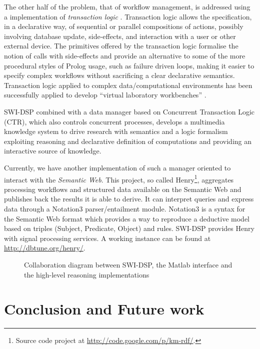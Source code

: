 \documentclass[runningheads]{llncs}
\begin{document}
The other half of the problem, that of workflow management, is addressed using a implementation of \emph{transaction logic} \cite{ctl}. Transaction logic allows the specification, in a declarative way, of sequential or parallel compositions of actions, possibly involving database update, side-effects, and interaction with a user or other external device. The primitives offered by the transaction logic formalise the notion of calls with side-effects and
provide an alternative to some of the more procedural styles of Prolog usage, such as failure driven loops, making it easier to specify complex workflows without sacrificing a clear declarative semantics. Transaction logic applied to complex data/computational environments has been successfully applied to develop ``virtual laboratory workbenches'' \cite{virtual}.

SWI-DSP combined with a data manager based on Concurrent Transaction Logic (CTR), which also controls concurrent processes, develops a multimedia knowledge system to drive research with semantics and a logic formalism exploiting reasoning and declarative definition of computations and providing an interactive source of knowledge.

Currently, we have another implementation of such a manager oriented to interact with the \textit{Semantic Web}. This project, so called Henry\footnote{Source code project at \url{http://code.google.com/p/km-rdf/}.}, aggregates processing workflows and structured data available on the Semantic Web and publishes back the results it is able to derive. It can interpret queries and express data through a Notation3 \cite{n3} parser/entailment module. Notation3 is a syntax for the Semantic Web format which provides a way to reproduce a deductive model based on triples (Subject, Predicate, Object) and rules. SWI-DSP provides Henry with signal processing services. A working instance can be found at \url{http://dbtune.org/henry/}.

\begin{figure}
\centerline{}
\caption{Collaboration diagram between SWI-DSP, the Matlab interface and the high-level reasoning implementations}
\label{fig:reasoners}
\end{figure}

\section{Conclusion and Future work}\label{sec:conclusion}
\end{document}
